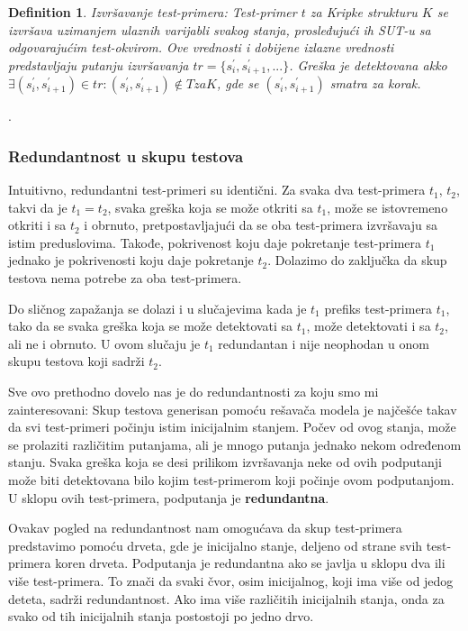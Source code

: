 \documentclass[a4paper]{article}
\newtheorem{definition}{Definition}[section]
\begin{document}
\begin{definition}{Izvršavanje test-primera:}
Test-primer $t$ za Kripke strukturu $K$ se izvršava uzimanjem ulaznih varijabli svakog stanja, prosleđujući ih SUT-u sa odgovarajućim test-okvirom. Ove vrednosti i dobijene izlazne vrednosti predstavljaju putanju izvršavanja $ tr = \{s_{i}^{'}, s_{i+1}^{'}, ...\} $. Greška je detektovana akko $ \exists (s_{i}^{'}, s_{i+1}^{'}) \in tr : (s_{i}^{'}, s_{i+1}^{'}) \notin T za K $, gde se $ (s_{i}^{'}, s_{i+1}^{'})$ smatra za korak.
\end{definition}.

\subsubsection{Redundantnost u skupu testova}
\label{subsubsec:redundantnost}

Intuitivno, redundantni test-primeri su identični. Za svaka dva test-primera $t_1$, $t_2$, takvi da je $ t_1 = t_2$, svaka greška koja se može otkriti sa $t_1$, može se istovremeno otkriti i sa $t_2$ i obrnuto, pretpostavljajući da se oba test-primera izvršavaju sa istim preduslovima. Takođe, pokrivenost koju daje pokretanje test-primera $t_1$ jednako je pokrivenosti koju daje pokretanje $t_2$. Dolazimo do zaključka da skup testova nema potrebe za oba test-primera.

Do sličnog zapažanja se dolazi i u slučajevima kada je $t_1$ prefiks test-primera $t_1$, tako da se svaka greška koja se može detektovati sa $t_1$, može detektovati i sa $t_2$, ali ne i obrnuto. U ovom slučaju je $t_1$ redundantan i nije neophodan u onom skupu testova koji sadrži $t_2$.

Sve ovo prethodno dovelo nas je do redundantnosti za koju smo mi zainteresovani: Skup testova generisan pomoću rešavača modela je najčešće takav da svi test-primeri počinju istim inicijalnim stanjem. Počev od ovog stanja, može se prolaziti različitim putanjama, ali je mnogo putanja jednako nekom određenom stanju. Svaka greška koja se desi prilikom izvršavanja neke od ovih podputanji može biti detektovana bilo kojim test-primerom koji počinje ovom podputanjom. U sklopu ovih test-primera, podputanja je \textbf{redundantna}.

Ovakav pogled na redundantnost nam omogućava da skup test-primera predstavimo pomoću drveta, gde je inicijalno stanje, deljeno od strane svih test-primera koren drveta. Podputanja je redundantna ako se javlja u sklopu dva ili više test-primera. To znači da svaki čvor, osim inicijalnog, koji ima više od jedog deteta, sadrži redundantnost. Ako ima više različitih inicijalnih stanja, onda za svako od tih inicijalnih stanja postostoji po jedno drvo.
\end{document}
